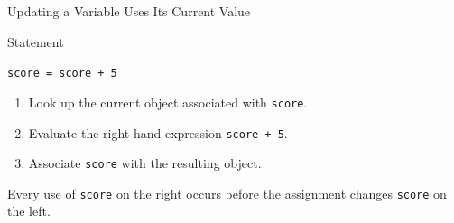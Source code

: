 \documentclass[aspectratio=169,10pt]{beamer}
\begin{document}

\begin{frame}{Updating a Variable Uses Its Current Value}

  \begin{block}{Statement}

    \centering
    \Large\texttt{score = score + 5}

  \end{block}

  \begin{enumerate}

    \item Look up the current object associated with \texttt{score}.

    \item Evaluate the right-hand expression \texttt{score + 5}.

    \item Associate \texttt{score} with the resulting object.

  \end{enumerate}

  \begin{keyidea}

    Every use of \texttt{score} on the right occurs before the assignment changes \texttt{score} on the left.

  \end{keyidea}

\end{frame}
\end{document}
